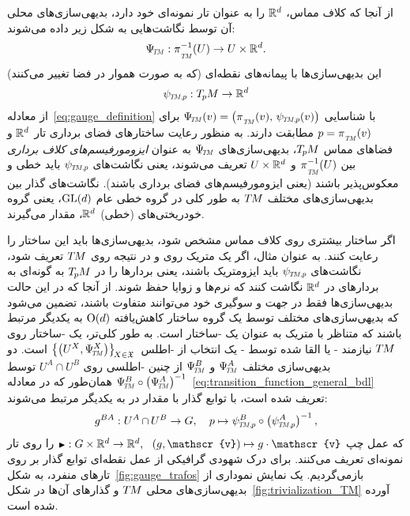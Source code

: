 از آنجا که کلاف مماس، $\mathbb{R}^d$ را به عنوان تار نمونه‌ای خود دارد، بدیهی‌سازی‌های محلی آن توسط نگاشت‌هایی به شکل زیر داده می‌شوند:
\begin{align}\label{eq:trivialization_TM}
	{\PsiTM: \piTM^{-1}\!\left(U\right) \to U\times\R^d} .
\end{align}
این بدیهی‌سازی‌ها با پیمانه‌های نقطه‌ای (که به صورت هموار در فضا تغییر می‌کنند)
\begin{align}\label{eq:def_psiTMp}
	\psiTMp: \TpM \to \R^d
\end{align}
از معادله~\eqref{eq:gauge_definition} با شناسایی $\PsiTM(v) = \left(\piTM(v),\, \psiTMp(v) \right)$ برای $p=\piTM(v)$ مطابقت دارند.
به منظور رعایت ساختارهای فضای برداری تار $\mathbb{R}^d$ و فضاهای مماس $T_{\mkern-1.5mu p}\mkern-.5muM$، بدیهی‌سازی‌های $\PsiTM$ به عنوان \emph{ایزومورفیسم‌های کلاف برداری} بین $\piTM^{-1}(U)$ و $U\times\mathbb{R}^d$ تعریف می‌شوند، یعنی نگاشت‌های $\psiTMp$ باید خطی و معکوس‌پذیر باشند (یعنی ایزومورفیسم‌های فضای برداری باشند).
نگاشت‌های گذار بین بدیهی‌سازی‌های مختلف $T\mkern-1.5muM$ به طور کلی در گروه خطی عام $\operatorname{GL}(d)$، یعنی گروه خودریختی‌های (خطی) $\mathbb{R}^d$، مقدار می‌گیرند.


اگر ساختار بیشتری روی کلاف مماس مشخص شود، بدیهی‌سازی‌ها باید این ساختار را رعایت کنند.
به عنوان مثال، اگر یک متریک روی  و در نتیجه روی $T\mkern-1.5muM$ تعریف شود، نگاشت‌های $\psiTMp$ باید ایزومتریک باشند، یعنی بردارها را در $T_{\mkern-1.5mu p}\mkern-.5muM$ به گونه‌ای به بردارهای در $\mathbb{R}^d$ نگاشت کنند که نرم‌ها و زوایا حفظ شوند.
از آنجا که در این حالت بدیهی‌سازی‌ها فقط در جهت و سوگیری خود می‌توانند متفاوت باشند، تضمین می‌شود که بدیهی‌سازی‌های مختلف توسط یک گروه ساختار کاهش‌یافته $\operatorname{O}(d)$ به یکدیگر مرتبط باشند که متناظر با متریک به عنوان یک -ساختار است.
به طور کلی‌تر، یک -ساختار روی $T\mkern-1.5muM$ نیازمند - یا القا شده توسط - یک انتخاب از -اطلس $\big\{ \big(U^X, \PsiTM^X \big) \big\}_{\!X\in\mathfrak{X}}\,$ است.
دو بدیهی‌سازی مختلف $\PsiTM^A$ و $\PsiTM^B$ از چنین -اطلسی روی $U^A\cap U^B$ توسط ${\PsiTM^B\circ\big(\PsiTM^A\big)^{-1}}$ همان‌طور که در معادله~\eqref{eq:transition_function_general_bdl} تعریف شده است، با توابع گذار با مقدار در  به یکدیگر مرتبط می‌شوند:
\begin{align}\label{eq:transition_fct_TM_gAB}
	g^{BA}: U^A\mkern-1mu \cap\mkern-1mu U^B \to G,\ \ \ p \mapsto \psiTMp^B\circ \big(\psiTMp^A\big)^{-1} \,,
\end{align}
که عمل چپ $\btr: G\times \R^d \to \R^d,\ \ (g,\mathscr{v}) \mapsto g\cdot \mathscr{v}$ را روی تار نمونه‌ای تعریف می‌کنند.
برای درک شهودی گرافیکی از عمل نقطه‌ای توابع گذار بر روی تارهای منفرد، به شکل~\ref{fig:gauge_trafos} بازمی‌گردیم.
یک نمایش نموداری از بدیهی‌سازی‌های محلی $T\mkern-1.5muM$ و گذارهای آن‌ها در شکل~\ref{fig:trivialization_TM} آورده شده است.

